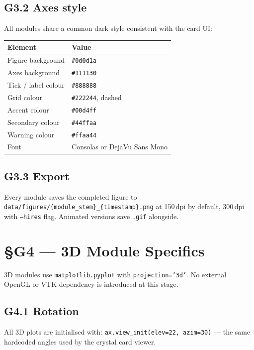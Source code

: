 \documentclass[11pt,a4paper]{article}
\begin{document}
\subsection{G3.2 Axes style}
All modules share a common dark style consistent with the card UI:

\begin{center}
\begin{tabular}{ll}
\toprule
Element & Value \\
\midrule
Figure background  & \texttt{\#0d0d1a} \\
Axes background    & \texttt{\#111130} \\
Tick / label colour & \texttt{\#888888} \\
Grid colour        & \texttt{\#222244}, dashed \\
Accent colour      & \texttt{\#00d4ff} \\
Secondary colour   & \texttt{\#44ffaa} \\
Warning colour     & \texttt{\#ffaa44} \\
Font               & Consolas or DejaVu Sans Mono \\
\bottomrule
\end{tabular}
\end{center}

\subsection{G3.3 Export}
Every module saves the completed figure to
\texttt{data/figures/\{module\_stem\}\_\{timestamp\}.png}
at 150\,dpi by default, 300\,dpi with \texttt{--hires} flag.
Animated versions save \texttt{.gif} alongside.

\section{\S{}G4 --- 3D Module Specifics}

3D modules use \texttt{matplotlib.pyplot} with \texttt{projection='3d'}.
No external OpenGL or VTK dependency is introduced at this stage.

\subsection{G4.1 Rotation}
All 3D plots are initialised with:
\texttt{ax.view\_init(elev=22, azim=30)} ---
the same hardcoded angles used by the crystal card viewer.
\end{document}
